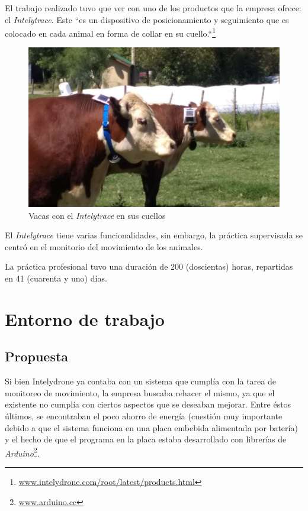 \documentclass{article}
\newcommand{ \fntrace }{\footnote{\url{www.intelydrone.com/root/latest/products.html}}}
\newcommand{ \fnarduino }{\footnote{\url{www.arduino.cc}}}
\begin{document}
    El trabajo realizado tuvo que ver con uno de los productos que la empresa
    ofrece: el \emph{Intelytrace}. Este ``es un dispositivo de posicionamiento 
    y seguimiento que es colocado en cada animal en forma de collar en su 
    cuello.``\fntrace 

    \begin{figure}[h]
        \includegraphics[width=0.7 \textwidth, center]{../primeras/trace.jpg}
        \caption{Vacas con el \emph{Intelytrace} en sus cuellos}
        \label{fig:trace}
    \end{figure} 

    \par
    El \emph{Intelytrace} tiene varias funcionalidades, sin embargo, la 
    práctica supervisada se centró en el monitorio del movimiento de los 
    animales. \par

    La práctica profesional tuvo una duración de 200 (doscientas) horas, 
    repartidas en 41 (cuarenta y  uno) días.

    
    \newpage
    \section{Entorno de trabajo}

    \subsection{Propuesta}
    Si bien Intelydrone ya contaba con un sistema que cumplía con la tarea 
    de monitoreo de movimiento, la empresa buscaba rehacer el mismo, ya que el
    existente no cumplía con ciertos aspectos que se deseaban mejorar. Entre 
    éstos últimos, se encontraban el poco ahorro de energía (cuestión muy 
    importante debido a que el sistema funciona en una placa embebida 
    alimentada por batería) y el hecho de que el programa en la placa estaba
    desarrollado con librerías de \emph{Arduino}\fnarduino. \par
\end{document}
